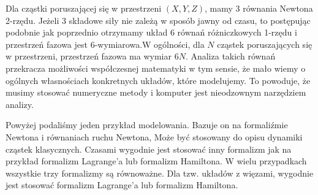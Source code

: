 \documentclass[a4paper,12pt,polish]{sphinxmanual}
\begin{document}
Dla cząstki poruszającej się w przestrzeni $(X, Y, Z)$, mamy 3 równania Newtona 2-rzędu. Jeżeli  3 składowe siły   nie zależą w sposób jawny od czasu, to postępując podobnie jak poprzednio otrzymamy  układ 6 równań różniczkowych 1-rzędu i przestrzeń fazowa jest 6-wymiarowa.W ogólności, dla $N$ cząstek poruszających się w przestrzeni, przestrzeń fazowa ma wymiar $6N$. Analiza takich równań przekracza możliwości współczesnej matematyki w tym sensie, że mało wiemy o ogólnych własnościach konkretnych układów, które modelujemy.  To powoduje, że musimy stosować numeryczne metody i komputer jest nieodzownym narzędziem analizy.

Powyżej podaliśmy jeden przykład modelowania. Bazuje on na formaliźmie Newtona i równaniach  ruchu Newtona, Może być stosowany do opisu dynamiki cząstek klasycznych. Czasami wygodnie jest stosować inny formalizm jak na przykład formalizm Lagrange'a lub formalizm Hamiltona. W wielu przypadkach wszystkie trzy formalizmy są równoważne. Dla tzw. układów z więzami, wygodnie jest stosować formalizm Lagrange'a lub formalizm Hamiltona.
\end{document}
